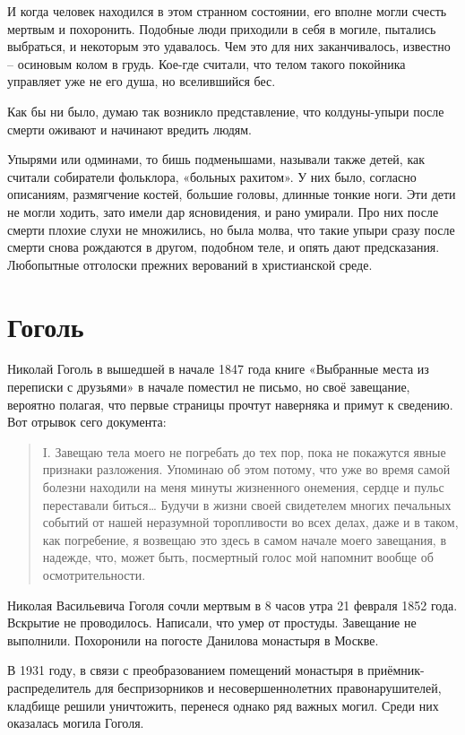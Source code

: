 \documentclass[a5paper,11pt,openany]{article}
\begin{document}
И когда человек находился в этом странном состоянии, его вполне могли счесть мертвым и похоронить. Подобные люди приходили в себя в могиле, пытались выбраться, и некоторым это удавалось. Чем это для них заканчивалось, известно – осиновым колом в грудь. Кое-где считали, что телом такого покойника управляет уже не его душа, но вселившийся бес. 

   Как бы ни было, думаю так возникло представление, что колдуны-упыри после смерти оживают и начинают вредить людям.

   Упырями или одминами, то бишь подменышами, называли также детей, как считали собиратели фольклора, «больных рахитом». У них было, согласно описаниям, размягчение костей, большие головы, длинные тонкие ноги. Эти дети не могли ходить, зато имели дар ясновидения, и рано умирали. Про них после смерти плохие слухи не множились, но была молва, что такие упыри сразу после смерти снова рождаются в другом, подобном теле, и опять дают предсказания. Любопытные отголоски прежних верований в христианской среде.


\section{Гоголь}

Николай Гоголь в вышедшей в начале 1847 года книге «Выбранные места из переписки с друзьями» в начале поместил не письмо, но своё завещание, вероятно полагая, что первые страницы прочтут наверняка и примут к сведению. Вот отрывок сего документа:

\begin{quotation}
\noindent I. Завещаю тела моего не погребать до тех пор, пока не покажутся явные признаки разложения. Упоминаю об этом потому, что уже во время самой болезни находили на меня минуты жизненного онемения, сердце и пульс переставали биться… Будучи в жизни своей свидетелем многих печальных событий от нашей неразумной торопливости во всех делах, даже и в таком, как погребение, я возвещаю это здесь в самом начале моего завещания, в надежде, что, может быть, посмертный голос мой напомнит вообще об осмотрительности.
\end{quotation}

Николая Васильевича Гоголя сочли мертвым в 8 часов утра 21 февраля 1852 года. Вскрытие не проводилось. Написали, что умер от простуды. Завещание не выполнили. Похоронили на погосте Данилова монастыря в Москве.

В 1931 году, в связи с преобразованием помещений монастыря в приёмник-распределитель для беспризорников и несовершеннолетних правонарушителей, кладбище решили уничтожить, перенеся однако ряд важных могил. Среди них оказалась могила Гоголя.
\end{document}
